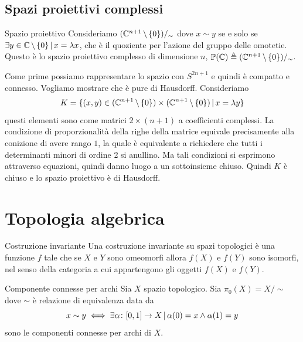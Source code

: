 \documentclass[a4paper]{article}
\begin{document}
\subsection{Spazi proiettivi complessi}

\begin{radioactive}
\begin{snippetdefinition}{Spazio proiettivo}
    Consideriamo \((\mathbb{C}^{n+1} \,\backslash\, \{0\}) /_\sim\)
    dove \(x \sim y\) se e solo se \(\exists y \in \mathbb{C} \,\backslash\, \{0\} \,|\, x = \lambda x\),
    che è il quoziente per l'azione del gruppo delle omotetie.
    Questo è lo spazio proiettivo complesso di dimensione \(n\),
    \(\mathbb{P}(\mathbb{C}) \triangleq (\mathbb{C}^{n+1} \,\backslash\, \{0\}) /_\sim\).
\end{snippetdefinition}
\end{radioactive}

Come prime possiamo rappresentare lo spazio con \(S^{2n + 1}\) e quindi è compatto e connesso.
Vogliamo mostrare che è pure di Hausdorff. Consideriamo
\[
    K = \{(x,y) \in (\mathbb{C}^{n+1} \,\backslash\, \{0\}) \times (\mathbb{C}^{n+1} \,\backslash\, \{0\}) \,|\, x = \lambda y\}
\]
questi elementi sono come matrici \(2\times(n+1)\) a coefficienti complessi.
La condizione di proporzionalità della righe della matrice equivale precisamente alla conizione di avere
rango \(1\), la quale è equivalente a richiedere che tutti i determinanti minori di ordine 2
si anullino.
Ma tali condizioni si esprimono attraverso equazioni, quindi danno luogo a un sottoinsieme chiuso.
Quindi \(K\) è chiuso e lo spazio proiettivo è di Hausdorff.


\pagebreak

\section{Topologia algebrica}

\begin{snippetdefinition}{Costruzione invariante}
    Una costruzione invariante su spazi topologici è una funzione \(f\) tale che
    se \(X\) e \(Y\) sono omeomorfi allora \(f(X)\) e \(f(Y)\) sono isomorfi,
    nel senso della categoria a cui appartengono gli oggetti \(f(X)\) e \(f(Y)\).
\end{snippetdefinition}

\begin{snippetdefinition}{Componente connesse per archi}
    Sia \(X\) spazio topologico.
    Sia \(\pi_0(X) = X/\sim\) dove \(\sim\) è relazione di equivalenza data da
    \[
        x \sim y \iff \exists \alpha \colon [0,1] \to X \,|\, \alpha(0) = x \land \alpha(1) = y
    \]
    sono le componenti connesse per archi di \(X\).
\end{snippetdefinition}
\end{document}

